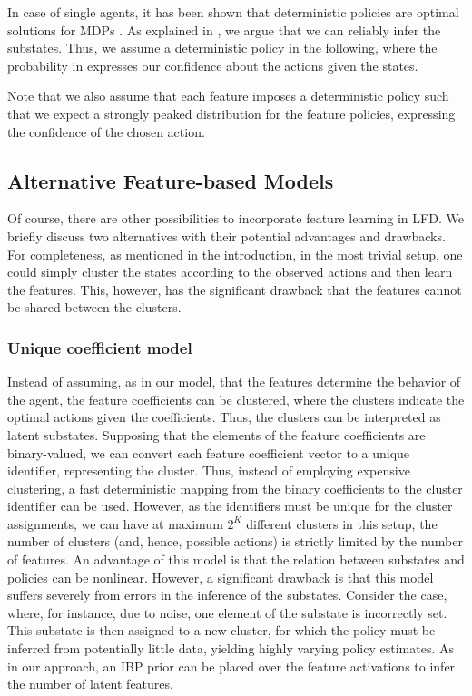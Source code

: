 \documentclass{article}
\begin{document}
In case of single agents, it has been shown that deterministic policies are optimal solutions for \ac{MDP}s \cite{Puterman1994}.
As explained in , we argue that we can reliably infer the substates.
Thus, we assume a deterministic policy in the following, where the probability in  expresses our confidence about the actions given the states. 

Note that we also assume that each feature imposes a deterministic policy such that we expect a strongly peaked distribution for the feature policies, expressing the confidence of the chosen action.

\subsection{Alternative Feature-based Models}
Of course, there are other possibilities to incorporate feature learning in \ac{LFD}. We briefly discuss two alternatives with their potential advantages and drawbacks. For completeness, as mentioned in the introduction, in the most trivial setup, one could simply cluster the states according to the observed actions and then learn the features. This, however, has the significant drawback that the features cannot be shared between the clusters.

\subsubsection{Unique coefficient model}
Instead of assuming, as in our model, that the features determine the behavior of the agent, the feature coefficients can be clustered, where the clusters indicate the optimal actions given the coefficients. 
Thus, the clusters can be interpreted as latent substates.
Supposing that the elements of the feature coefficients are binary-valued, we can convert each feature coefficient vector to a unique identifier, representing the cluster.
Thus, instead of employing expensive clustering, a fast deterministic mapping from the binary coefficients to the cluster identifier can be used.
However, as the identifiers must be unique for the cluster assignments, we can have at maximum $2^K$ different clusters in this setup, \ie the number of clusters (and, hence, possible actions) is strictly limited by the number of features.
An advantage of this model is that the relation between substates and policies can be nonlinear.
However, a significant drawback is that this model suffers severely from errors in the inference of the substates. 
Consider the case, where, for instance, due to noise, one element of the substate is incorrectly set.
This substate is then assigned to a new cluster, for which the policy must be inferred from potentially little data, yielding highly varying policy estimates.
As in our approach, an \ac{IBP} prior can be placed over the feature activations to infer the number of latent features.
\end{document}
